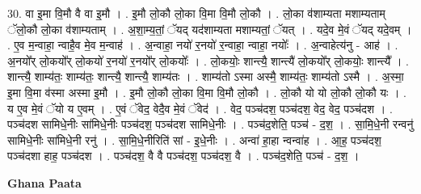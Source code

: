 \documentclass[17pt]{extarticle}
\begin{document}
30. वा इ॒मा वि॒मौ वै वा इ॒मौ । . इ॒मौ लो॒कौ लो॒का वि॒मा वि॒मौ लो॒कौ । . लो॒का व॑शाम्यता मशाम्यताम् ॅलो॒कौ लो॒का व॑शाम्यताम् । . अ॒शा॒म्य॒तां॒ ॅयद् यद॑शाम्यता मशाम्यतां॒ ॅयत् । . यदे॒व मे॒वं ॅयद् यदे॒वम् । . ए॒व म॒न्वाहा॒ न्वाहै॒व मे॒व म॒न्वाह॑ । . अ॒न्वाहा॒ नयो॑ र॒नयो॑ र॒न्वाहा॒ न्वाहा॒ नयोः᳚ । . अ॒न्वाहेत्य॑नु - आह॑ । . अ॒नयो᳚र् लो॒कयो᳚र् लो॒कयो॑ र॒नयो॑ र॒नयो᳚र् लो॒कयोः᳚ । . लो॒कयोः॒ शान्त्यै॒ शान्त्यै॑ लो॒कयो᳚र् लो॒कयोः॒ शान्त्यै᳚ । . शान्त्यै॒ शाम्य॑तः॒ शाम्य॑तः॒ शान्त्यै॒ शान्त्यै॒ शाम्य॑तः । . शाम्य॑तो ऽस्मा अस्मै॒ शाम्य॑तः॒ शाम्य॑तो ऽस्मै । . अ॒स्मा॒ इ॒मा वि॒मा व॑स्मा अस्मा इ॒मौ । . इ॒मौ लो॒कौ लो॒का वि॒मा वि॒मौ लो॒कौ । . लो॒कौ यो यो लो॒कौ लो॒कौ यः । . य ए॒व मे॒वं ॅयो य ए॒वम् । . ए॒वं ॅवेद॒ वेदै॒व मे॒वं ॅवेद॑ । . वेद॒ पञ्च॑दश॒ पञ्च॑दश॒ वेद॒ वेद॒ पञ्च॑दश । . पञ्च॑दश सामिधे॒नीः सा॑मिधे॒नीः पञ्च॑दश॒ पञ्च॑दश सामिधे॒नीः । . पञ्च॑द॒शेति॒ पञ्च॑ - द॒श॒ । . सा॒मि॒धे॒नी रन्वनु॑ सामिधे॒नीः सा॑मिधे॒नी रनु॑ । . सा॒मि॒धे॒नीरिति॑ सां - इ॒धे॒नीः । . अन्वा॑ हा॒हा न्वन्वा॑ह । . आ॒ह॒ पञ्च॑दश॒ पञ्च॑दशा हाह॒ पञ्च॑दश । . पञ्च॑दश॒ वै वै पञ्च॑दश॒ पञ्च॑दश॒ वै । . पञ्च॑द॒शेति॒ पञ्च॑ - द॒श॒ । \newline

\textbf{Ghana Paata } \newline
\end{document}

